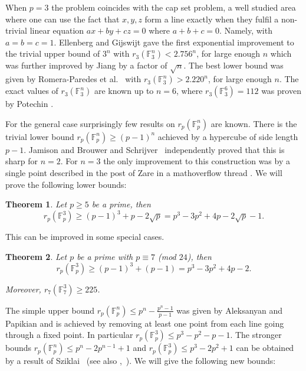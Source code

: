 \documentclass[12pt]{amsart}
\newcommand{\F}{{\mathbb F}}
\newcommand{\<}{\langle}
\renewcommand{\>}{\rangle}
\newtheorem{theorem}{Theorem}
\numberwithin{equation}{section}
\numberwithin{theorem}{section}
\begin{document}
When $p=3$ the problem coincides with the cap set problem, a well studied area where one can use the fact that  $x,y,z$ form a line exactly when they fulfil a non-trivial linear equation $ax+by+cz=0$ where $a+b+c=0$. Namely, with $a=b=c=1$. Ellenberg and Gijswijt \cite{EG} gave the first exponential improvement to the trivial upper bound of $3^n$ with $r_3(\mathbb{F}_3^{n})<2.756^n$, for large enough $n$ which was further improved by Jiang \cite{Jiang} by a factor of $\sqrt{n}$. The best lower bound was given by Romera-Paredes et al.~\cite{DeepMind} with $r_3(\mathbb{F}_3^{n})>2.220^n$, for large enough $n$. The exact values of $r_3(\mathbb{F}_3^{n})$ are known up to $n=6$, where $r_3(\mathbb{F}_3^{6})=112$ was proven by Potechin \cite{Potechin}.



For the general case surprisingly few results on $r_p(\F_p^n)$ are known. There is the trivial lower bound $r_p(\mathbb{F}_p^n)\geq(p-1)^n$ achieved by a hypercube of side length $p-1$. Jamison \cite{Jamison} and Brouwer and Schrijver~\cite{BS} independently proved that this is sharp for $n=2$. For $n=3$ the only improvement to this construction was by a single point described in the post of Zare in a mathoverflow thread \cite{Mathoverflow}. We will prove the following lower bounds:

\begin{theorem}
\label{LBhighp}
Let $p\geq 5$ be a prime, then $$r_p(\mathbb{F}_p^3) \geq (p-1)^3+p-2\sqrt{p}=p^3-3p^2+4p-2\sqrt{p}-1.$$
\end{theorem}

This can be improved in some special cases.

\begin{theorem}
\label{LB7}
Let $p$ be a prime with $p\equiv 7$ \textnormal{(mod $24$)}, then 
$$r_p(\mathbb{F}_p^3)\geq(p-1)^3+(p-1)=p^3-3p^2+4p-2.$$


Moreover, $r_7(\mathbb{F}_7^3)\geq 225$.
\end{theorem}

The simple upper bound $r_p(\mathbb{F}_p^n)\leq p^n-\frac{p^n-1}{p-1}$ was given by Aleksanyan and Papikian \cite{AP} and is achieved by removing at least one point from each line going through a fixed point. In particular $r_p(\mathbb{F}_p^3)\leq p^3-p^2-p-1$. The stronger bounds $r_p(\mathbb{F}_p^n)\leq p^n-2p^{n-1}+1$ and $r_p(\mathbb{F}_p^3)\leq p^3-2p^{2}+1$ can be obtained by a result of Sziklai~\cite[Proposition~4.1]{Sziklai} (see also \cite{ball2009},~\cite{BDGP}). We will give the following new bounds:
\end{document}

